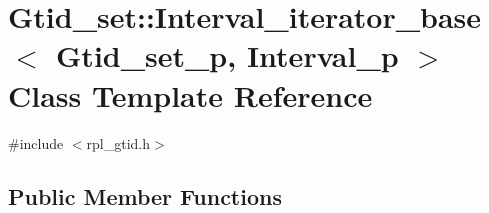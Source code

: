 \hypertarget{classGtid__set_1_1Interval__iterator__base}{}\section{Gtid\+\_\+set\+:\+:Interval\+\_\+iterator\+\_\+base$<$ Gtid\+\_\+set\+\_\+p, Interval\+\_\+p $>$ Class Template Reference}
\label{classGtid__set_1_1Interval__iterator__base}


{\ttfamily \#include $<$rpl\+\_\+gtid.\+h$>$}

\subsection*{Public Member Functions}
